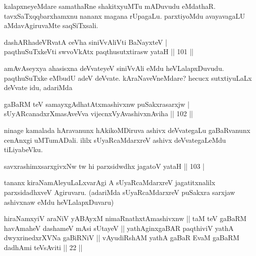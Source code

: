 \begin{artha}
kalapxneyeMdare samathaRne shakitxyuMTu mADuvudu eMdathaR. 
tavxSaTxqqbarxhamxnu nananx magana rUpagaLu. parxtiyoMdu avayavagaLU 
aMdavAgiruvaMte saqSiTxsali.
\end{artha}


\begin{shl}
dashARhadeVRvatA ceVha siniVvAliVti BaNayxteV | \\
paqthuSuTxkeVti swvoVkAtx paqthusutxtirasw yataH \hfill|| 101 || 
\end{shl}

\begin{artha}
amAvAseyxya ahasisxna deVvateyeV siniVvAli eMdu heVLalapxDuvudu. 
paqthuSuTxke eMbudU adeV deVvate. kAraNaveVneMdare? hecucx 
sutxtiyuLaLx deVvate idu, adariMda
\end{artha}

\begin{shl}
gaBaRM teV samayxgAdhatAtxmashivxnw puSakxrasarxjw | \\
sUyARcanadxrXmasAveVva vijecnxVyAvashivxnAviha \hfill|| 102 || 
\end{shl}

\begin{artha}
ninage kamalada hAravanunx hAkikoMDiruva ashivx deVvategaLu 
gaBaRvanunx cenAnxgi uMTumADali. ililx sUyaRcaMdarxreV ashivx 
deVvategaLeMdu tiLiyabeVku.
\end{artha}


\begin{shl}
savxrashimxsarxgivxNw tw hi parxsidwdhx jagatoV yataH \hfill|| 103 | \\
\end{shl}

\begin{artha}
tananx kiraNamAleyuLaLxvarAgi A sUyaRcaMdarxreV jagatitxnalilx 
parxsidadhxveV Agiruvaru. (adariMda sUyaRcaMdarxreV puSakxra sarxjaw 
ashivxnaw eMdu heVLalapxDuvaru)
\end{artha}

\begin{kandikeshl}
hiraNamxyiV araNiV yABAyxM nimaRnathxtAmashivxnw || taM teV gaBaRM havAmaheV dashameV mAsi sUtayeV || yathAginxgaBAR paqthiviV yathA dwyxrinedxrXVNa gaBiRNiV || vAyudiRshAM yathA gaBaR EvaM gaBaRM dadhAmi teV\s sAviti || 22 ||
\end{kandikeshl}
 
